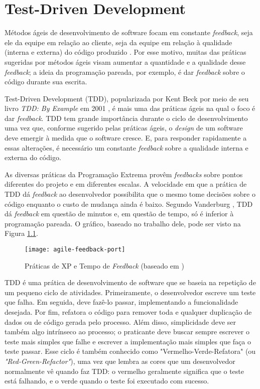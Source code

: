 \chapter{Test-Driven Development}
\label{cap:tdd}

Métodos ágeis de desenvolvimento de software focam em constante
\textit{feedback}, seja ele da equipe em relação ao cliente, seja da equipe em relação à
qualidade (interna e externa) do código produzido \cite{AgileManifesto}. Por
esse motivo, muitas das práticas sugeridas por métodos ágeis visam aumentar a 
quantidade e a qualidade desse \textit{feedback}; a ideia da programação pareada, por
exemplo, é dar \textit{feedback} sobre o código durante sua escrita.

Test-Driven Development (TDD), popularizada por Kent Beck por meio de seu livro
\textit{TDD: By Example} em 2001 \cite{TDDByExample}, é mais uma das práticas
ágeis na qual o foco é dar \textit{feedback}. TDD tem grande importância durante o ciclo
de desenvolvimento uma vez que, conforme sugerido pelas práticas ágeis, o \textit{design} de um
software deve emergir à medida que o software cresce. E, para responder
rapidamente a essas alterações, é necessário um constante \textit{feedback} sobre a
qualidade interna e externa do código.

As diversas práticas da Programação Extrema provêm \textit{feedbacks} sobre pontos diferentes 
do projeto e em diferentes escalas. 
A velocidade em que a prática de TDD dá \textit{feedback} ao desenvolvedor possibilita que o mesmo
tome decisões sobre o código enquanto o custo de mudança ainda é
baixo. Segundo Vanderburg \cite{vanderburg}, TDD dá \textit{feedback} em questão de
minutos e, em questão de tempo, só é inferior à programação pareada. O gráfico,
baseado no trabalho dele, pode ser visto na Figura
\ref{fig:agile-feedback}.

\begin{figure}
  \centering
  \texttt{[image: agile-feedback-port]}
  \caption{Práticas de XP e Tempo de \textit{Feedback} (baseado em \cite{vanderburg})}
  \label{fig:agile-feedback}
\end{figure}

TDD é uma prática de desenvolvimento de software que se baseia na repetição de
um pequeno ciclo de atividades. Primeiramente, o desenvolvedor escreve um
teste que falha. Em seguida, deve fazê-lo passar, implementando a
funcionalidade desejada. Por fim, refatora o código para remover toda e qualquer
duplicação de dados ou de código gerada pelo processo.
Além disso, simplicidade deve ser também algo intrínseco ao processo; o praticante
deve buscar sempre escrever o teste mais simples que falhe e escrever a implementação mais simples
que faça o teste passar.
Esse ciclo
é também conhecido como 
"Vermelho-Verde-Refatora" (ou \textit{"Red-Green-Refactor"}), uma vez que lembra as cores que um 
desenvolvedor normalmente vê quando faz TDD: o vermelho geralmente significa que
o teste está falhando, e o verde quando o teste foi executado com sucesso.

